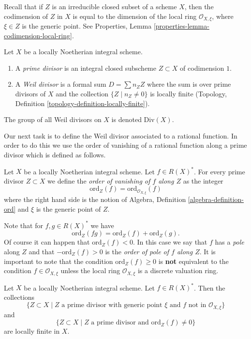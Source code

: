 \noindent
Recall that if $Z$ is an irreducible closed subset of a scheme $X$,
then the codimension of $Z$ in $X$ is equal to the dimension
of the local ring $\mathcal{O}_{X, \xi}$, where $\xi \in Z$
is the generic point. See
Properties, Lemma \ref{properties-lemma-codimension-local-ring}.

\begin{definition}
\label{definition-Weil-divisor}
Let $X$ be a locally Noetherian integral scheme.
\begin{enumerate}
\item A {\it prime divisor} is an integral closed subscheme $Z \subset X$
of codimension $1$.
\item A {\it Weil divisor} is a formal sum $D = \sum n_Z Z$ where
the sum is over prime divisors of $X$ and the collection
$\{Z \mid n_Z \not = 0\}$ is locally finite
(Topology, Definition \ref{topology-definition-locally-finite}).
\end{enumerate}
The group of all Weil divisors on $X$ is denoted $\text{Div}(X)$.
\end{definition}

\noindent
Our next task is to define the Weil divisor associated to a rational
function. In order to do this we use the order of vanishing of a
rational function along a prime divisor which is defined as follows.

\begin{definition}
\label{definition-order-vanishing}
Let $X$ be a locally Noetherian integral scheme. Let $f \in R(X)^*$.
For every prime divisor $Z \subset X$ we define the
{\it order of vanishing of $f$ along $Z$} as the integer
$$
\text{ord}_Z(f) = \text{ord}_{\mathcal{O}_{X, \xi}}(f)
$$
where the right hand side is the notion of
Algebra, Definition \ref{algebra-definition-ord}
and $\xi$ is the generic point of $Z$.
\end{definition}

\noindent
Note that for $f, g \in R(X)^*$ we have
$$
\text{ord}_Z(fg) = \text{ord}_Z(f) + \text{ord}_Z(g).
$$
Of course it can happen that $\text{ord}_Z(f) < 0$.
In this case we say that $f$ has a {\it pole} along $Z$
and that $-\text{ord}_Z(f) > 0$ is the
{\it order of pole of $f$ along $Z$}. It is important to note
that the condition $\text{ord}_Z(f) \geq 0$ is {\bf not} equivalent
to the condition $f \in \mathcal{O}_{X, \xi}$ unless the local
ring $\mathcal{O}_{X, \xi}$ is a discrete valuation ring.

\begin{lemma}
\label{lemma-divisor-locally-finite}
Let $X$ be a locally Noetherian integral scheme. Let $f \in R(X)^*$.
Then the collections
$$
\{Z \subset X \mid Z\text{ a prime divisor with generic point }\xi
\text{ and }f\text{ not in }\mathcal{O}_{X, \xi}\}
$$
and
$$
\{Z \subset X \mid Z \text{ a prime divisor and }\text{ord}_Z(f) \not = 0\}
$$
are locally finite in $X$.
\end{lemma}

